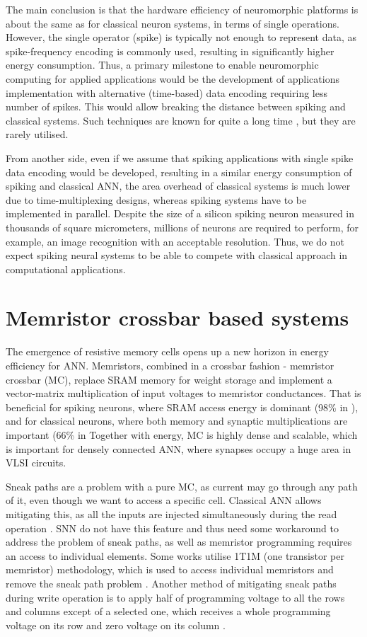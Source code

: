 \documentclass[conference, compsoc]{IEEEtran}
\begin{document}
The main conclusion is that the hardware efficiency of neuromorphic platforms is about the same as for classical neuron systems, in terms of single operations. However, the single operator (spike) is typically not enough to represent data, as spike-frequency encoding is commonly used, resulting in significantly higher energy consumption. Thus, a primary milestone to enable neuromorphic computing for applied applications would be the development of applications implementation with alternative (time-based) data encoding requiring less number of spikes. This would allow breaking the distance between spiking and classical systems. Such techniques are known for quite a long time \cite{Thorpe:encodings}, but they are rarely utilised.

From another side, even if we assume that spiking applications with single spike data encoding would be developed, resulting in a similar energy consumption of spiking and classical ANN, the area overhead of classical systems is much lower due to time-multiplexing designs, whereas spiking systems have to be implemented in parallel. Despite the size of a silicon spiking neuron measured in thousands of square micrometers, millions of neurons are required to perform, for example, an image recognition with an acceptable resolution. Thus, we do not expect spiking neural systems to be able to compete with classical approach in computational applications.

\section{Memristor crossbar based systems}
The emergence of resistive memory cells opens up a new horizon in energy efficiency for ANN. Memristors, combined in a crossbar fashion - memristor crossbar (MC), replace SRAM memory for weight storage and implement a vector-matrix multiplication of input voltages to memristor conductances. That is beneficial for spiking neurons, where SRAM access energy is dominant (98\% in \cite{12p}), and for classical neurons, where both memory and synaptic multiplications are important (66\% in \cite{DianNao} Together with energy, MC is highly dense and scalable, which is important for densely connected ANN, where synapses occupy a huge area in VLSI circuits.

Sneak paths are a problem with a pure MC, as current may go through any path of it, even though we want to access a specific cell. Classical ANN allows mitigating this, as all the inputs are injected simultaneously during the read operation \cite{Memristor_approximated,RRAM_approximated}. SNN do not have this feature and thus need some workaround to address the problem of sneak paths, as well as memristor programming requires an access to individual elements. Some works utilise 1T1M (one transistor per memristor) methodology, which is used to access individual memristors and remove the sneak path problem \cite{Spiking_resistive_crossbar,STT_SNN,ex_situ}. Another method of mitigating sneak paths during write operation is to apply half of programming voltage to all the rows and columns except of a selected one, which receives a whole programming voltage on its row and zero voltage on its column \cite{RRAM_approximated,Segmented_memristor}.
\end{document}
